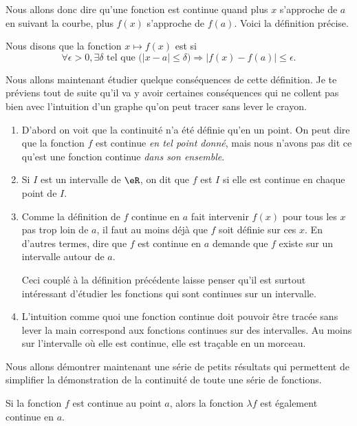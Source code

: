 \documentclass{article}
\begin{document}
Nous allons donc dire qu'une fonction est continue quand plus $x$ s'approche de $a$ en suivant la courbe, plus $f(x)$ s'approche de $f(a)$. Voici la définition précise.

\begin{definition}		\label{DefContinue}
Nous disons que la fonction $x\mapsto f(x)$ est  si
\begin{equation}
 \forall \epsilon>0,\exists \delta\text{ tel que } \big(| x-a |\leq\delta\big)\Rightarrow | f(x)-f(a) |\leq \epsilon.
\end{equation}

\end{definition}

Nous allons maintenant étudier quelque conséquences de cette définition. Je te préviens tout de suite qu'il va y avoir certaines conséquences qui ne collent pas bien avec l'intuition d'un graphe qu'on peut tracer sans lever le crayon.

\begin{enumerate}
\item D'abord on voit que la continuité n'a été définie qu'en un point. On peut dire que la fonction $f$ est continue \emph{en tel point donné}, mais nous n'avons pas dit ce qu'est une fonction continue \emph{dans son ensemble}.

\item Si $I$ est un intervalle de $\eR$, on dit que $f$ est  $I$ si elle est continue en chaque point de $I$.

\item Comme la définition de $f$ continue en $a$ fait intervenir $f(x)$ pour tous les $x$ pas trop loin de $a$, il faut au moins déjà que $f$ soit définie sur ces $x$. En d'autres termes, dire que $f$ est continue en $a$ demande que $f$ existe sur un intervalle autour de $a$. 

Ceci couplé à la définition précédente laisse penser qu'il est surtout intéressant d'étudier les fonctions qui sont continues sur un intervalle.

\item L'intuition comme quoi une fonction continue doit pouvoir être tracée sans lever la main correspond aux fonctions continues sur des intervalles. Au moins sur l'intervalle où elle est continue, elle est traçable en un morceau.
\end{enumerate}


Nous allons démontrer maintenant une série de petits résultats qui permettent de simplifier la démonstration de la continuité de toute une série de fonctions.
\begin{theorem}
Si la fonction $f$ est continue au point $a$, alors la fonction $\lambda f$ est également continue en $a$.
\end{theorem}
\end{document}
